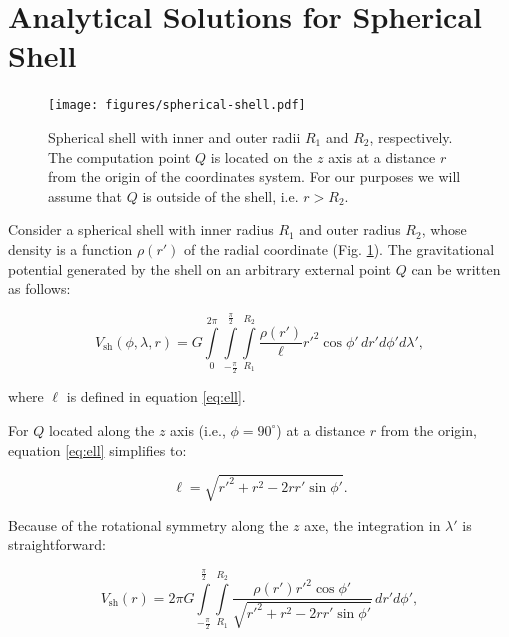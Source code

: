 \documentclass[extra, referee]{gji}
\begin{document}




\appendix

\section{Analytical Solutions for Spherical Shell}
\label{sec:shell}

\begin{figure}
\centering
\texttt{[image: figures/spherical-shell.pdf]}
\caption{
    Spherical shell with inner and outer radii $R_1$ and $R_2$, respectively.
    The computation point $Q$ is located on the $z$ axis at a distance $r$ from
    the origin of the coordinates system.
    For our purposes we will assume that $Q$ is outside of the shell,
    i.e. $r > R_2$.
}
\label{fig:spherical-shell}
\end{figure}

Consider a spherical shell with inner radius $R_1$ and outer radius $R_2$,
whose density is a function $\rho(r')$ of the radial coordinate
(Fig. \ref{fig:spherical-shell}).
The gravitational potential generated by the shell on an arbitrary external
point $Q$ can be written as follows:

\begin{equation}
    V_\text{sh}(\phi, \lambda, r) = G
    \int\limits_0^{2\pi}
    \int\limits_{-\frac{\pi}{2}}^\frac{\pi}{2}
    \int\limits_{R_1}^{R_2}
    \frac{\rho(r')}{\ell} {r'}^2 \cos\phi' \,
    dr' d\phi' d\lambda',
\end{equation}

\noindent where $\ell$ is defined in equation \ref{eq:ell}.

For $Q$ located along the $z$ axis (i.e., $\phi=90^\circ$) at a distance $r$ from the
origin, equation \ref{eq:ell} simplifies to:

\begin{equation}
    \ell = \sqrt{r'^2 + r^2 - 2 r r' \sin\phi'}.
\end{equation}

\noindent
Because of the rotational symmetry along the $z$ axe, the integration in $\lambda'$ is
straightforward:

\begin{equation}
    V_\text{sh}(r) = 2\pi G
    \int\limits_{-\frac{\pi}{2}}^\frac{\pi}{2}
    \int\limits_{R_1}^{R_2}
    \frac{\rho(r') {r'}^2 \cos\phi'}{\sqrt{r'^2 + r^2 - 2 r r' \sin\phi'}}
    \, dr' d\phi',
\end{equation}
\end{document}
